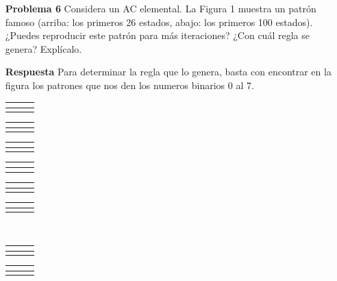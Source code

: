 \documentclass{article}
\begin{document}
\begin{enumerate}
\item[\bf{Problema 6}] Considera un AC elemental. La Figura 1 muestra un patrón famoso (arriba: los primeros 26 estados, abajo: los primeros 100 estados). ¿Puedes reproducir este patrón para más iteraciones? ¿Con cuál regla se genera? Explícalo.

\item[\bf{Respuesta}]
Para determinar la regla que lo genera, basta con encontrar en la figura los patrones que nos den los numeros binarios 0 al 7.\\
\begin{tabular}{c|c|c}
  \hline
 \multicolumn{1}{|c|}{ }&  & \multicolumn{1}{c|}{ }  \\
  \hline
 &  & \\
\cline{2-2}
\end{tabular}
\quad
\begin{tabular}{c|c|c}
  \hline
 \multicolumn{1}{|c|}{ }&  & \multicolumn{1}{c|}{\cellcolor{gray}}  \\
  \hline
 &  \cellcolor{gray} & \\
\cline{2-2}
\end{tabular}
\quad
\begin{tabular}{c|c|c}
  \hline
 \multicolumn{1}{|c|}{ }&\cellcolor{gray} & \multicolumn{1}{c|}{ }  \\
  \hline
 &  \cellcolor{gray} & \\
\cline{2-2}
\end{tabular}
\quad
\begin{tabular}{c|c|c}
  \hline
 \multicolumn{1}{|c|}{ }&\cellcolor{gray} & \multicolumn{1}{c|}{\cellcolor{gray}}  \\
  \hline
 &  \cellcolor{gray} & \\
\cline{2-2}
\end{tabular}
\quad
\begin{tabular}{c|c|c}
  \hline
 \multicolumn{1}{|c|}{\cellcolor{gray}}& & \multicolumn{1}{c|}{ }  \\
  \hline
 & & \\
\cline{2-2}
\end{tabular}
\quad %
\begin{tabular}{c|c|c}
  \hline
 \multicolumn{1}{|c|}{\cellcolor{gray}}& & \multicolumn{1}{c|}{\cellcolor{gray}}\\
  \hline
 &  \cellcolor{gray} & \\
\cline{2-2}
\end{tabular}\\

\begin{tabular}{c|c|c}
  \hline
 \multicolumn{1}{|c|}{\cellcolor{gray}}&\cellcolor{gray}& \multicolumn{1}{c|}{}\\
  \hline
 &  \cellcolor{gray} & \\
\cline{2-2}
\end{tabular}
\quad %
\begin{tabular}{c|c|c}
  \hline
 \multicolumn{1}{|c|}{\cellcolor{gray}}&\cellcolor{gray}&\multicolumn{1}{c|}{\cellcolor{gray}}\\
  \hline
 & & \\
\cline{2-2}
\end{tabular}\\


\end{enumerate}
\end{document}
